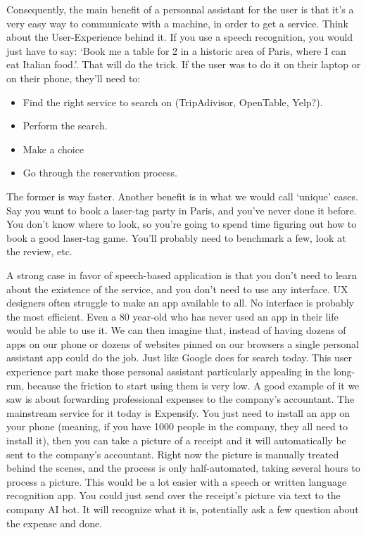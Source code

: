 \documentclass[12pt]{article}
\begin{document}
Consequently, the main benefit of a personnal assistant for the user is that it's a very easy way to
communicate with a machine, in order to get a service. Think about the
User-Experience behind it. If you use a speech recognition, you would just
have to say: \lq Book me a table for 2 in a historic area of Paris, where I
can eat Italian
food.\rq. That will do the trick.
If the user was to do it on their laptop or on their phone, they'll need to:
\begin{itemize}
  \item Find the right service to search on (TripAdivisor, OpenTable, Yelp?).
  \item Perform the search.
  \item Make a choice
  \item Go through the reservation process.
\end{itemize}

The former is way faster. Another benefit is in what we would call \lq unique\rq
cases. Say you want to book a laser-tag party in Paris, and you've never done it
before. You don't know where to look, so you're going to spend time figuring out
how to book a good laser-tag game. You'll probably need to benchmark a few,
look at the review, etc.

A strong case in favor of speech-based application is that you don't need to
learn about the existence of the service, and you don't need to use any
interface. UX designers often struggle to make an app available to all. No
interface is probably the most efficient. Even a 80 year-old who has never used
an app in their life would be able to use it. We can then imagine that, instead
of having dozens of apps on our phone or dozens of websites pinned on our
browsers a single personal assistant app could do the job. Just like Google
does for search today. This user experience part make those personal assistant
particularly appealing in the long-run, because the friction to start using them
is very low. A good example of it we saw is about forwarding professional
expenses to the company's accountant. The mainstream service for it today is
Expensify. You just need to install an app on your phone (meaning, if you have
1000 people in the company, they all need to install it), then you can take a
picture of a receipt and it will automatically be sent to the company's
accountant. Right now the picture is manually treated behind the scenes, and the
process is only half-automated, taking several hours to process a picture.
This would be a lot easier with a speech or written language
recognition app. You could just send over the receipt's picture via text to the
company AI bot. It will recognize what it is, potentially ask a few question
about the expense and done.
\end{document}
